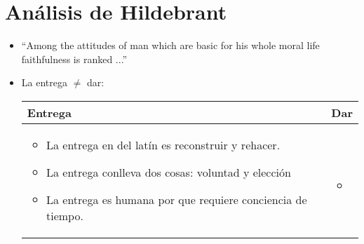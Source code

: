 \section{Análisis de Hildebrant}
\begin{itemize}
    \item ``Among the attitudes of man which are basic for his whole moral life faithfulness is ranked ...''
    \item La entrega $\neq$ dar:
        \begin{center}
           \begin{tabular}{ | p{5cm} | p{5cm} |}
               \hline
                    Entrega & Dar    \\
               \hline
                    \begin{itemize}
                        \item La entrega en del latín es reconstruir y rehacer.
                        \item La entrega conlleva dos cosas: voluntad y elección 
                        \item La entrega es humana por que requiere conciencia de tiempo. 
                    \end{itemize}
                    & 
                    \begin{itemize}
                        \item  
                    \end{itemize}
                    \\ 
               \hline
           \end{tabular}
        \end{center}
\end{itemize}
